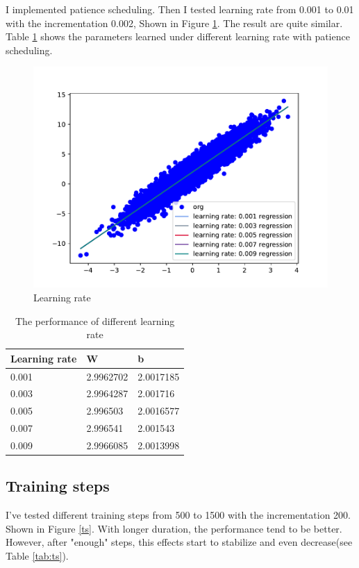 \documentclass{article}
\begin{document}
I implemented patience scheduling. Then I tested learning rate from 0.001 to 0.01 with the incrementation 0.002, Shown in Figure \ref{lr}. The result are quite similar. Table \ref{tab:lr} shows the parameters learned under different learning rate with patience scheduling.

\begin{figure}
  \centering
  \includegraphics[scale=0.5]{imgs/lr.pdf}
  \caption{Learning rate}
  \label{lr}
\end{figure}

\begin{table}
  \caption{The performance of different learning rate}
  \label{tab:lr}
  \centering
  \begin{tabular}{lll}
    \toprule
    Learning rate     & W     & b \\
    \midrule
    0.001 & 2.9962702  & 2.0017185     \\
    0.003     & 2.9964287 & 2.001716     \\
    0.005     & 2.996503       & 2.0016577  \\
    0.007     & 2.996541 & 2.001543      \\
    0.009     & 2.9966085      & 2.0013998  \\
    \bottomrule
  \end{tabular}
\end{table}

\subsection{Training steps}
I've tested different training steps from 500 to 1500 with the incrementation 200. Shown in Figure \ref{ts}. With longer duration, the performance tend to be better. However, after "enough" steps, this effects start to stabilize and even decrease(see Table \ref{tab:ts}).
\end{document}
